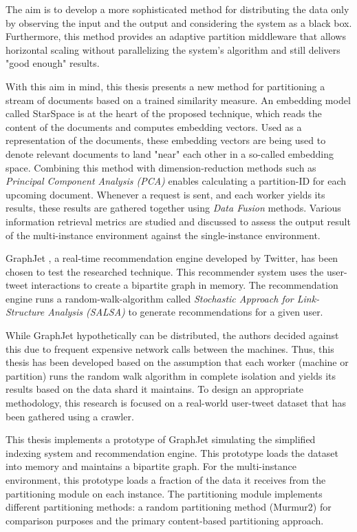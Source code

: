 The aim is to develop a more sophisticated method for distributing the data only by observing the input and the output and considering the system as a black box. Furthermore, this method provides an adaptive partition middleware that allows horizontal scaling without parallelizing the system's algorithm and still delivers "good enough" results. 


With this aim in mind, this thesis presents a new method for partitioning a stream of documents based on a trained similarity measure. An embedding model called StarSpace \cite{wuStarSpaceEmbedAll2017} is at the heart of the proposed technique, which reads the content of the documents and computes embedding vectors. Used as a representation of the documents, these embedding vectors are being used to denote relevant documents to land "near" each other in a so-called embedding space. Combining this method with dimension-reduction methods such as \emph{Principal Component Analysis (PCA)} \cite{woldPrincipalComponentAnalysis1987} enables calculating a partition-ID for each upcoming document. Whenever a request is sent, and each worker yields its results, these results are gathered together using \emph{Data Fusion} methods. Various information retrieval metrics are studied and discussed to assess the output result of the multi-instance environment against the single-instance environment.


GraphJet \cite{sharmaGraphJetRealtimeContent2016}, a real-time recommendation engine developed by Twitter, has been chosen to test the researched technique. This recommender system uses the user-tweet interactions to create a bipartite graph in memory. The recommendation engine runs a random-walk-algorithm called \emph{Stochastic Approach for Link-Structure Analysis (SALSA)} \cite{lempelSALSAStochasticApproach2001} to generate recommendations for a given user. 


While GraphJet hypothetically can be distributed, the authors decided against this due to frequent expensive network calls between the machines. Thus, this thesis has been developed based on the assumption that each worker (machine or partition) runs the random walk algorithm in complete isolation and yields its results based on the data shard it maintains. To design an appropriate methodology, this research is focused on a real-world user-tweet dataset that has been gathered using a crawler. 


This thesis implements a prototype of GraphJet simulating the simplified indexing system and recommendation engine. This prototype loads the dataset into memory and maintains a bipartite graph. For the multi-instance environment, this prototype loads a fraction of the data it receives from the partitioning module on each instance. The partitioning module implements different partitioning methods: a random partitioning method (Murmur2) for comparison purposes and the primary content-based partitioning approach.


